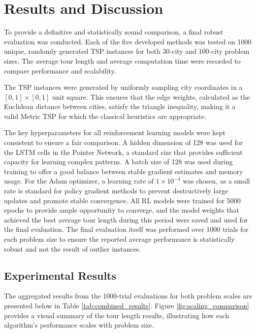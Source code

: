 \documentclass[12pt]{article}
\theoremstyle{remarkstyle}
\begin{document}
\section{Results and Discussion}
To provide a definitive and statistically sound comparison, a final robust evaluation was conducted. Each of the five developed methods was tested on 1000 unique, randomly generated TSP instances for both 30-city and 100-city problem sizes. The average tour length and average computation time were recorded to compare performance and scalability.


The TSP instances were generated by uniformly sampling city coordinates in a $[0, 1] \times [0, 1]$ unit square. This ensures that the edge weights, calculated as the Euclidean distance between cities, satisfy the triangle inequality, making it a valid Metric TSP for which the classical heuristics are appropriate.

The key hyperparameters for all reinforcement learning models were kept consistent to ensure a fair comparison. A hidden dimension of 128 was used for the LSTM cells in the Pointer Network, a standard size that provides sufficient capacity for learning complex patterns. A batch size of 128 was used during training to offer a good balance between stable gradient estimates and memory usage. For the Adam optimizer, a learning rate of $1 \times 10^{-4}$ was chosen, as a small rate is standard for policy gradient methods to prevent destructively large updates and promote stable convergence. All RL models were trained for 5000 epochs to provide ample opportunity to converge, and the model weights that achieved the best average tour length during this period were saved and used for the final evaluation. The final evaluation itself was performed over 1000 trials for each problem size to ensure the reported average performance is statistically robust and not the result of outlier instances.

\subsection{Experimental Results}
The aggregated results from the 1000-trial evaluations for both problem scales are presented below in Table \ref{tab:combined_results}. Figure \ref{fig:scaling_comparison} provides a visual summary of the tour length results, illustrating how each algorithm's performance scales with problem size.
\end{document}

